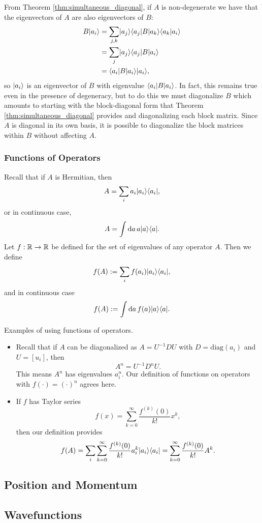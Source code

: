 From Theorem \ref{thm:simultaneous_diagonal}, if $A$ is non-degenerate we have that the eigenvectors of $A$ are also eigenvectors of $B$:
\begin{align*}
    B\lvert a_i \rangle &= \sum_{j, k} \lvert a_j \rangle\langle a_j \rvert B \lvert a_k \rangle\langle a_k\vert a_i \rangle \\
    &= \sum_{j} \lvert a_j \rangle\langle a_j \rvert B \lvert a_i \rangle \\
    &= \langle a_i \rvert B \lvert a_i \rangle\lvert a_i \rangle,
\end{align*}
so $\lvert a_i \rangle$ is an eigenvector of $B$ with eigenvalue $\langle a_i \rvert B \lvert a_i \rangle$. In fact, this remains true even in the presence of degeneracy, but to do this we must diagonalize $B$ which amounts to starting with the block-diagonal form that Theorem \ref{thm:simultaneous_diagonal} provides and diagonalizing each block matrix. Since $A$ is diagonal in its own basis, it is possible to diagonalize the block matrices within $B$ without affecting $A$.

\subsubsection{Functions of Operators}
Recall that if $A$ is Hermitian, then
$$A = \sum_i a_i \lvert a_i \rangle\langle a_i \rvert,$$
or in continuous case,
$$A = \int \mathrm da\, a\lvert a \rangle\langle a \rvert.$$
Let $f:\mathbb{R}\to \mathbb{R}$ be defined for the set of eigenvalues of any operator $A$. Then we define
$$f(A) := \sum_i f(a_i) \lvert a_i \rangle\langle a_i \rvert,$$
and in continuous case
$$f(A) := \int \mathrm da\, f(a)\lvert a \rangle\langle a \rvert.$$


\begin{example}
    Examples of using functions of operators.
    \begin{itemize}
        \item Recall that if $A$ can be diagonalized as $A = U^{-1} D U$ with $D = \text{diag}(a_i)$ and $U = [u_i]$, then
        $$A^n = U^{-1}D^n U.$$
        This means $A^n$ has eigenvalues $a_i^n$. Our definition of functions on operators with $f(\cdot) = (\cdot)^n$ agrees here.
        \item If $f$ has Taylor series
        $$f(x) = \sum_{k=0}^\infty \frac{f^{(k)}(0)}{k!}x^k,$$
        then our definition provides
        $$f(A) = \sum_i \sum_{k=0}^\infty \frac{f^{(k)}(0)}{k!}a_i^k\lvert a_i \rangle\langle a_i \rvert = \sum_{k=0}^\infty \frac{f^{(k)}(0)}{k!}A^k.$$
    \end{itemize}
\end{example}

\subsection{Position and Momentum}
\subsection{Wavefunctions}
